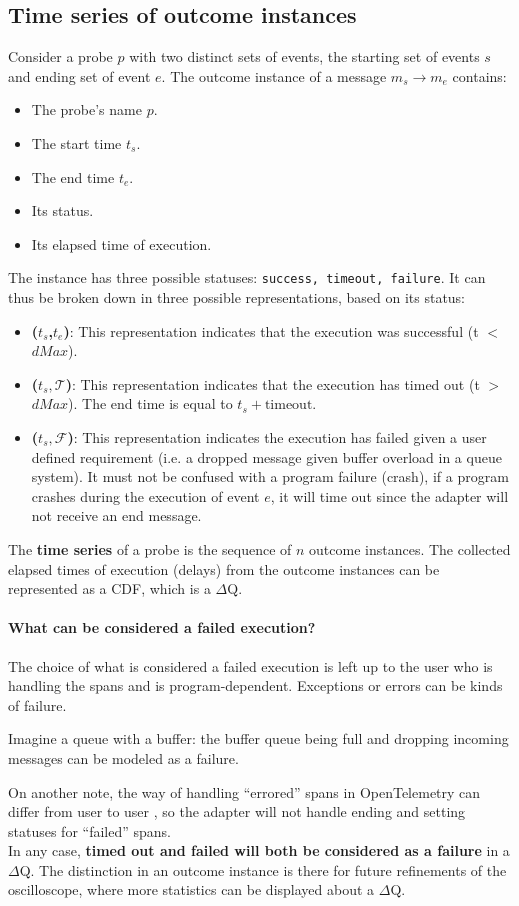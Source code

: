 \subsection{Time series of outcome instances}
    Consider a probe $p$ with two distinct sets of events, the starting set of events $s$ and ending set of event $e$. The outcome instance of a message $m_s \rightarrow m_e$ contains:
    \begin{itemize}
        \item The probe's name $p$.
        \item The start time $t_s$.
        \item The end time $t_e$.
        \item Its status.
        \item Its elapsed time of execution.
    \end{itemize}
    The instance has three possible statuses: \texttt{success, timeout, failure}. It can thus be broken down in three possible representations, based on its status:
    \begin{itemize}
        \item \textbf{($t_s$,$t_e$)}: This representation indicates that the execution was successful (t $<$ $dMax$). 
        \item \textbf{($t_s, \mathcal{T}$)}: This representation indicates that the execution has timed out (t $>$ $dMax$). The end time is equal to $t_s + \text{timeout}$.
        \item \textbf{($t_s, \mathcal{F}$)}: This representation indicates the execution has failed given a user defined requirement (i.e. a dropped message given buffer overload in a queue system). It must not be confused with a program failure (crash), if a program crashes during the execution of event $e$, it will time out since the adapter will not receive an end message.
    \end{itemize}
    The \textbf{time series} of a probe is the sequence of $n$ outcome instances. The collected elapsed times of execution (delays) from the outcome instances can be represented as a CDF, which is a $\Delta$Q.

    \paragraph{What can be considered a failed execution?} The choice of what is considered a failed execution is left up to the user who is handling the spans and is program-dependent. Exceptions or errors can be kinds of failure.

    Imagine a queue with a buffer: the buffer queue being full and dropping incoming messages can be modeled as a failure.

    On another note, the way of handling ``errored'' spans in OpenTelemetry can differ from user to user  \cite{otel-err}, so the adapter will not handle ending and setting statuses for ``failed'' spans. \\
   In any case, \textbf{timed out and failed will both be considered as a failure} in a $\Delta$Q. The distinction in an outcome instance is there for future refinements of the oscilloscope, where more statistics can be displayed about a $\Delta$Q.
